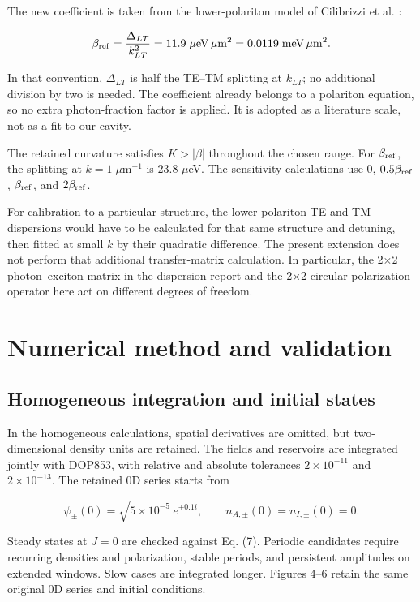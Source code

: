 \documentclass[12pt,a4paper]{article}
\begin{document}
The new coefficient is taken from the lower-polariton model of Cilibrizzi et al. \cite{ref6}:

\[
\beta_{\rm ref}=\frac{\Delta_{LT}}{k_{LT}^2}
=11.9\;\mu\mathrm{eV}\,\mu\mathrm m^2
=0.0119\;\mathrm{meV}\,\mu\mathrm m^2.
\]

In that convention, \(\Delta_{LT}\) is half the TE--TM splitting at \(k_{LT}\); no additional division by two is needed. The coefficient already belongs to a polariton equation, so no extra photon-fraction factor is applied. It is adopted as a literature scale, not as a fit to our cavity.

The retained curvature satisfies \(K>|\beta|\) throughout the chosen range. For \(\beta_{\rm ref}\), the splitting at \(k=1\;\mu\mathrm m^{-1}\) is 23.8 \ensuremath{\mu}eV. The sensitivity calculations use \(0\), \(0.5\beta_{\rm ref}\), \(\beta_{\rm ref}\), and \(2\beta_{\rm ref}\).

For calibration to a particular structure, the lower-polariton TE and TM dispersions would have to be calculated for that same structure and detuning, then fitted at small \(k\) by their quadratic difference. The present extension does not perform that additional transfer-matrix calculation. In particular, the 2×2 photon--exciton matrix in the dispersion report and the 2×2 circular-polarization operator here act on different degrees of freedom.

\section{Numerical method and validation}

\subsection{Homogeneous integration and initial states}

In the homogeneous calculations, spatial derivatives are omitted, but two-dimensional density units are retained. The fields and reservoirs are integrated jointly with DOP853, with relative and absolute tolerances \(2\times10^{-11}\) and \(2\times10^{-13}\). The retained 0D series starts from

\[
\psi_\pm(0)=\sqrt{5\times10^{-5}}\,e^{\pm0.1i},\qquad
n_{A,\pm}(0)=n_{I,\pm}(0)=0.
\]

Steady states at \(J=0\) are checked against Eq. (7). Periodic candidates require recurring densities and polarization, stable periods, and persistent amplitudes on extended windows. Slow cases are integrated longer. Figures 4--6 retain the same original 0D series and initial conditions.
\end{document}
